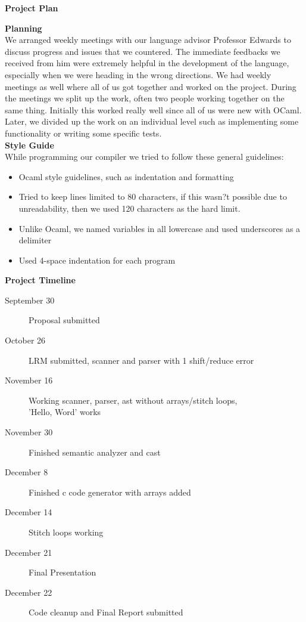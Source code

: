 \documentclass[11pt, oneside]{article}   	%
\newcommand{\tab} {\hspace*{2em}}
\begin{document}
\newpage

\LARGE\textbf{Project Plan}\\[2em]
\normalsize

\Large\textbf{Planning}\\[1em]
\normalsize
We arranged weekly meetings with our language advisor Professor Edwards to discuss progress and issues that we countered. The immediate feedbacks we received from him were extremely helpful in the development of the language, especially when we were heading in the wrong directions. We had weekly meetings as well where all of us got together and worked on the project. During the meetings we split up the work, often two people working together on the same thing. Initially this worked really well since all of us were new with OCaml. Later, we divided up the work on an individual level such as implementing some functionality or writing some specific tests.\\[3em]
\Large\textbf{Style Guide}\\[1em]
\normalsize
While programming our compiler we tried to follow these general guidelines:
\begin{itemize}
  \item Ocaml style guidelines, such as indentation and formatting
  \item Tried to keep lines limited to 80 characters, if this wasn?t possible due to unreadability, then we used 120 characters as the hard limit.
  \item Unlike Ocaml, we named variables in all lowercase and used underscores as a delimiter
  \item Used 4-space indentation for each program 
\end{itemize}
\newpage
\Large\textbf{Project Timeline}\\[0em]
\normalsize
\tab\begin{description}
  \item[September 30] Proposal submitted
  \item[October 26] LRM submitted, scanner and parser with 1 shift/reduce error
  \item[November 16] Working scanner, parser, ast without arrays/stitch loops, \\[.5em]'Hello, Word' works
  \item[November 30] Finished semantic analyzer and cast
  \item[December 8] Finished c code generator with arrays added
  \item[December 14] Stitch loops working 
  \item[December 21] Final Presentation
  \item[December 22] Code cleanup and Final Report submitted 
\end{description}
\end{document}
